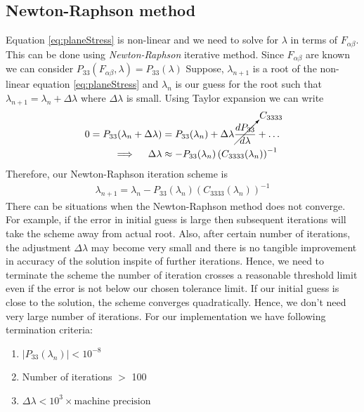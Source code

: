 \documentclass[../main.tex]{subfiles}
\begin{document}
\subsection{Newton-Raphson method}
\label{sec:NR}
Equation \ref{eq:planeStress} is non-linear and we need to solve for
$\lambda$ in terms of $F_{\alpha\beta}$. This can be done using
\textit{Newton-Raphson} iterative method. Since $F_{\alpha\beta}$ are
known we can consider $P_{33}(F_{\alpha\beta},\lambda) =
P_{33}(\lambda)$ Suppose, $\lambda_{n+1}$ is a root of the non-linear
equation \ref{eq:planeStress} and $\lambda_{n}$ is our guess for the
root such that $\lambda_{n+1}=\lambda_{n}+\Delta\lambda$ where
$\Delta\lambda$ is small. Using Taylor expansion we can write
\begin{align*}
  0 = P_{33}(\lambda_n+\Delta\lambda) &=P_{33}(\lambda_n) + \Delta\lambda\cancelto{C_{3333}}{\frac{dP_{33}}{d\lambda}} + \ldots\\
  \implies \quad \Delta\lambda &\approx -P_{33}(\lambda_n)\left(C_{3333}(\lambda_n)\right)^{-1}
\end{align*}
Therefore, our Newton-Raphson iteration scheme is 
\begin{align}
  \boxed{\lambda_{n+1} = \lambda_n- P_{33}(\lambda_n)\left(C_{3333}(\lambda_n)\right)^{-1}}
\end{align}
There can be situations when the Newton-Raphson method does not
converge. For example, if the error in initial guess is large then
subsequent iterations will take the scheme away from actual
root. Also, after certain number of iterations, the adjustment
$\Delta\lambda$ may become very small and there is no tangible
improvement in accuracy of the solution inspite of further
iterations. Hence, we need to terminate the scheme the number of
iteration crosses a reasonable threshold limit even if the error is
not below our chosen tolerance limit. If our initial guess is close to
the solution, the scheme converges quadratically. Hence, we don't need
very large number of iterations. For our implementation we have
following termination criteria:
\begin{enumerate}
\item $|P_{33}(\lambda_n)| < 10^{-8}$
\item Number of iterations $>$ 100
\item $\Delta\lambda < 10^3\times \text{machine precision}$
\end{enumerate}
\end{document}
